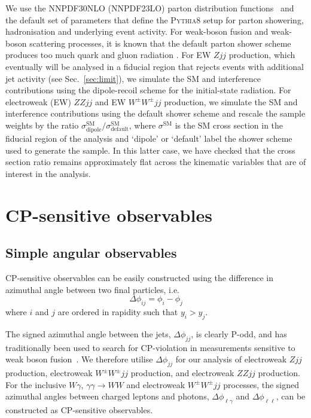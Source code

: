 \documentclass[twocolumn,preprintnumbers,superscriptaddress,nofootinbib,aps,prd,floatfix]{revtex4}
\newcommand{\pythia}{\textsc{Pythia8}}
\begin{document}
We use the NNPDF30NLO (NNPDF23LO) parton distribution functions~\cite{Ball:2012cx} and the default set of parameters that define the \pythia{} setup for parton showering, hadronisation and underlying event activity. For weak-boson fusion and weak-boson scattering processes, it is known that the default parton shower scheme produces too much quark and gluon radiation \cite{ATLAS:2019hoc,Hoche:2021mkv}. For EW $Zjj$ production, which eventually will be analysed in a fiducial region that rejects events with additional jet activity (see Sec.~\ref{sec:limit}), we simulate the SM and interference contributions using the dipole-recoil scheme for the initial-state radiation. For electroweak (EW) $ZZjj$ and EW $W^\pm W^\pm jj$ production, we simulate the SM and interference contributions using the default shower scheme and rescale the sample weights by the ratio $\sigma_\textrm{dipole}^\textrm{SM}/\sigma^\textrm{SM}_\textrm{default}$, where $\sigma^\textrm{SM}$ is the SM cross section in the fiducial region of the analysis and `dipole' or `default' label the shower scheme used to generate the sample. In this latter case, we have checked that the cross section ratio remains approximately flat across the kinematic variables that are of interest in the analysis.


\section{CP-sensitive observables}
\label{sec:cpvar}
\subsection{Simple angular observables}
CP-sensitive observables can be easily constructed using the difference in azimuthal angle between two final particles, i.e.
\begin{equation}
\Delta\phi_{ij} = \phi_i - \phi_j
\end{equation}
where $i$ and $j$ are ordered in rapidity such that $y_i > y_j$. 

The signed azimuthal angle between the jets, $\Delta\phi_{jj}$, is clearly P-odd, and has traditionally been used to search for CP-violation in measurements sensitive to weak boson fusion~\cite{Plehn:2001nj}. We therefore utilise $\Delta\phi_{jj}$ for our analysis of electroweak $Zjj$ production, electroweak $W^\pm W^\pm jj$ production, and electroweak $ZZjj$ production. For the inclusive $W\gamma$, $\gamma\gamma \rightarrow WW$ and electroweak $W^\pm W^\pm jj$ processes, the signed azimuthal angles between charged leptons and photons, $\Delta \phi_{\ell \gamma}$ and $\Delta \phi_{\ell \ell}$, can be constructed as CP-sensitive observables. 
\end{document}
